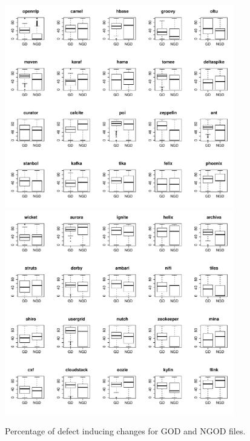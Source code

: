 \begin{figure}[tb]
	\centering
	\includegraphics[width=100mm]{figures/chapter4/rq2_god_boxplots_1}
	\includegraphics[width=100mm]{figures/chapter4/rq2_god_boxplots_2}
	\caption{Percentage of defect inducing changes for GOD and NGOD files.}
	\label{figure:percentage_of_bug_inducing_god_vs_ngod}
\end{figure}


